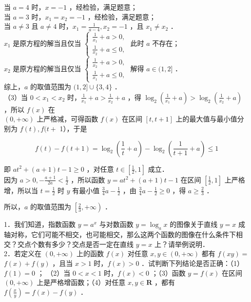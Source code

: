\documentclass[10pt]{article}
\begin{document}
当 \(a=4\) 时，\(x=-1\) ，经检验，满足题意；\\
当 \(a=3\) 时，\(x_{1}=x_{2}=-1\) ，经检验，满足题意；\\
当 \(a \neq 3\) 且 \(a \neq 4\) 时，\(x_{1}=\frac{1}{a-4}, x_{2}=-1\) ，且 \(x_{1} \neq x_{2}\) ．\\
\(x_{1}\) 是原方程的解当且仅当 \(\left\{\begin{array}{l}\frac{1}{x_{1}}+a>0, \\ \frac{1}{x_{2}}+a \leqslant 0,\end{array}\right.\) 此时 \(a\) 不存在；\\
\(x_{2}\) 是原方程的解当且仅当 \(\left\{\begin{array}{l}\frac{1}{x_{2}}+a>0, \\ \frac{1}{x_{1}}+a \leqslant 0,\end{array}\right.\) 解得 \(a \in(1,2]\) ．\\
综上，\(a\) 的取值范围为 \((1,2] \cup\{3,4\}\) ．\\
（3）当 \(0<x_{1}<x_{2}\) 时，\(\frac{1}{x_{1}}+a>\frac{1}{x_{2}}+a\) ，得 \(\log _{2}\left(\frac{1}{x_{1}}+a\right)>\log _{2}\left(\frac{1}{x_{2}}+a\right)\) ，所以 \(f(x)\) 在\\
\((0,+\infty)\) 上严格减，可得函数 \(f(x)\) 在区间 \([t, t+1]\) 上的最大值与最小值分别为 \(f(t), f(t+\) 1），于是

\[
f(t)-f(t+1)=\log _{2}\left(\frac{1}{t}+a\right)-\log _{2}\left(\frac{1}{t+1}+a\right) \leqslant 1
\]

即 \(a t^{2}+(a+1) t-1 \geqslant 0\) ，对任意 \(t \in\left[\frac{1}{2}, 1\right]\) 成立．\\
因为 \(a>0,-\frac{a+1}{2 a}<\frac{1}{2}\) ，所以函数 \(y=a t^{2}+(a+1) t-1\) 在区间 \(\left[\frac{1}{2}, 1\right]\) 上严格增，所以当 \(t=\frac{1}{2}\) 时 \(y\) 有最小值 \(\frac{3}{4} a-\frac{1}{2}\) ，由 \(\frac{3}{4} a-\frac{1}{2} \geqslant 0\) ，得 \(a \geqslant \frac{2}{3}\) ．

所以，\(a\) 的取值范围为 \(\left[\frac{2}{3},+\infty\right)\) ．

1．我们知道，指数函数 \(y=a^{x}\) 与对数函数 \(y=\log _{a} x\) 的图像关于直线 \(y=x\) 成轴对称，它们可能不相交，也可能相交，那么这两个函数的图像在什么条件下相交？交点个数有多少？交点是否一定在直线 \(y=x\) 上？请举例说明．\\
2．若定义在 \((0,+\infty)\) 上的函数 \(f(x)\) 对任意 \(x, y \in(0,+\infty)\) 都有 \(f(x y)=\) \(f(x)+f(y)\) ，且当 \(x>1\) 时，\(f(x)>0\) ．试判断下列结论是否正确：（1）\(f(1)=0\) ； （2）当 \(0<x<1\) 时，\(f(x)<0\) ；（3）函数 \(y=f(x)\) 在区间 \((0,+\infty)\) 上是严格增函数；（4）对任意 \(x, y \in \mathbf{R}\) ，都有 \(f\left(\frac{x}{y}\right)=f(x)-f(y)\) ．
\end{document}
